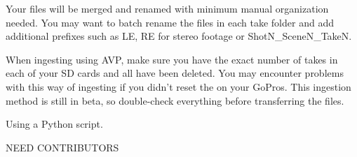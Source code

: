 \begin{fullwidth}

Your files will be merged and renamed with minimum manual organization needed. You may want to batch rename the files in each take folder and add additional prefixes such as LE, RE for stereo footage or ShotN\_SceneN\_TakeN.

\tip When ingesting using AVP, make sure you have the exact number of takes in each of your SD cards and all \textbf{} have been deleted. You may encounter problems with this way of ingesting if you didn't reset the \textbf{} on your GoPros. This ingestion method is still in beta, so double-check everything before transferring the files.

{\large Using a Python script. \par}

NEED CONTRIBUTORS

\clearpage
\end{fullwidth}
